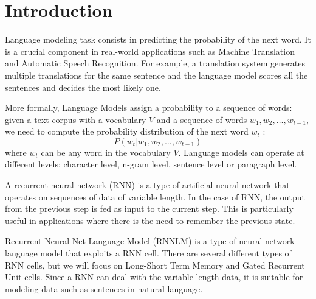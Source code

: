 \section{Introduction}
Language modeling task consists in predicting the probability of the next word.
It is a crucial component in real-world applications such as Machine Translation 
and Automatic Speech Recognition. For example, a translation system generates multiple 
translations for the same sentence and the language model scores all the sentences 
and decides the most likely one.

More formally, Language Models assign a probability to a sequence of words: 
given a text corpus with a vocabulary $V$ and a sequence of words $w_1,w_2, \dots, w_{t-1}$, 
we need to compute the probability distribution of the next word $w_t$ \cite{LM_definition}:
\begin{equation}
    P(w_{t} | w_1, w_2, \dots, w_{t-1})
\end{equation}
where $w_t$ can be any word in the vocabulary $V$.
Language models can operate at different levels: character level, n-gram level, 
sentence level or paragraph level.

A recurrent neural network (RNN) is a type of artificial neural network that 
operates on sequences of data of variable length. In the case of RNN, the output 
from the previous step is fed as input to the current step. This is particularly 
useful in applications where there is the need to remember the previous state.

Recurrent Neural Net Language Model (RNNLM) is a type of neural network language 
model that exploits a RNN cell. There are several different types of RNN cells, %
but we will focus on Long-Short Term Memory \cite{LSTM} and Gated Recurrent Unit 
\cite{GRU} cells. Since a RNN can deal with the variable length data, it is 
suitable for modeling data such as sentences in natural language.

